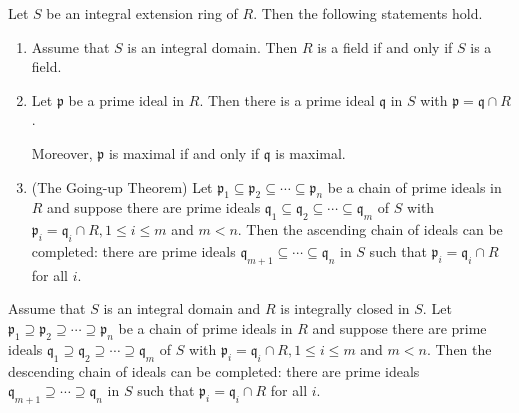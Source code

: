 \begin{theorem}
    Let $S$ be an integral extension ring of $R$. Then the following statements hold.
    \begin{enumerate}
        \item
              Assume that $S$ is an integral domain. Then $R$ is a field if and only if $S$ is a field.
        \item
              Let $\mathfrak{p}$ be a prime ideal in $R$. Then there is a prime ideal $\mathfrak{q}$ in $S$ with $\mathfrak{p}=\mathfrak{q} \cap R$.

              Moreover, $\mathfrak{p}$ is maximal if and only if $\mathfrak{q}$ is maximal.
        \item
              (The Going-up Theorem)
              Let $\mathfrak{p}_1 \subseteq \mathfrak{p}_2 \subseteq \cdots \subseteq \mathfrak{p}_n$ be a chain of prime ideals in $R$ and suppose there are prime ideals $\mathfrak{q}_1 \subseteq \mathfrak{q}_2 \subseteq \cdots \subseteq \mathfrak{q}_m$ of $S$ with $\mathfrak{p}_i=\mathfrak{q}_i \cap R, 1 \leq i \leq m$ and $m<n$. Then the ascending chain of ideals can be completed: there are prime ideals $\mathfrak{q}_{m+1} \subseteq \cdots \subseteq \mathfrak{q}_n$ in $S$ such that $\mathfrak{p}_i=\mathfrak{q}_i \cap R$ for all $i$.
    \end{enumerate}
\end{theorem}


\begin{theorem} 
    Assume that $S$ is an integral domain and $R$ is integrally closed in $S$. Let $\mathfrak{p}_1 \supseteq \mathfrak{p}_2 \supseteq \cdots \supseteq \mathfrak{p}_n$ be a chain of prime ideals in $R$ and suppose there are prime ideals $\mathfrak{q}_1 \supseteq \mathfrak{q}_2 \supseteq \cdots \supseteq \mathfrak{q}_m$ of $S$ with $\mathfrak{p}_i=\mathfrak{q}_i \cap R, 1 \leq i \leq m$ and $m<n$. Then the descending chain of ideals can be completed: there are prime ideals $\mathfrak{q}_{m+1} \supseteq \cdots \supseteq \mathfrak{q}_n$ in $S$ such that $\mathfrak{p}_i=\mathfrak{q}_i \cap R$ for all $i$.
\end{theorem}















